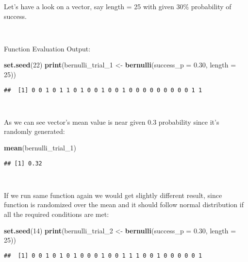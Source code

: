 \documentclass[]{article}
\newenvironment{Shaded}{\begin{snugshade}}{\end{snugshade}}
\newcommand{\DataTypeTok}[1]{\textcolor[rgb]{0.13,0.29,0.53}{#1}}
\newcommand{\DecValTok}[1]{\textcolor[rgb]{0.00,0.00,0.81}{#1}}
\newcommand{\FloatTok}[1]{\textcolor[rgb]{0.00,0.00,0.81}{#1}}
\newcommand{\KeywordTok}[1]{\textcolor[rgb]{0.13,0.29,0.53}{\textbf{#1}}}
\newcommand{\NormalTok}[1]{#1}
\newcommand{\StringTok}[1]{\textcolor[rgb]{0.31,0.60,0.02}{#1}}
\begin{document}
Let's have a look on a vector, say length = 25 with given 30\%
probability of success.

~

Function Evaluation Output:

\begin{Shaded}
\begin{Highlighting}[]
\KeywordTok{set.seed}\NormalTok{(}\DecValTok{22}\NormalTok{)}
\KeywordTok{print}\NormalTok{(bernulli_trial_}\DecValTok{1}\NormalTok{ <-}\StringTok{ }\KeywordTok{bernulli}\NormalTok{(}\DataTypeTok{success_p =} \FloatTok{0.30}\NormalTok{, }\DataTypeTok{length =} \DecValTok{25}\NormalTok{))}
\end{Highlighting}
\end{Shaded}

\begin{verbatim}
##  [1] 0 0 1 0 1 1 0 1 0 0 1 0 0 1 0 0 0 0 0 0 0 0 0 1 1
\end{verbatim}

~

As we can see vector's mean value is near given 0.3 probability since
it's randomly generated:

\begin{Shaded}
\begin{Highlighting}[]
\KeywordTok{mean}\NormalTok{(bernulli_trial_}\DecValTok{1}\NormalTok{)}
\end{Highlighting}
\end{Shaded}

\begin{verbatim}
## [1] 0.32
\end{verbatim}

~

If we run same function again we would get slightly different result,
since function is randomized over the mean and it should follow normal
distribution if all the required conditions are met:

\begin{Shaded}
\begin{Highlighting}[]
\KeywordTok{set.seed}\NormalTok{(}\DecValTok{14}\NormalTok{)}
\KeywordTok{print}\NormalTok{(bernulli_trial_}\DecValTok{2}\NormalTok{ <-}\StringTok{ }\KeywordTok{bernulli}\NormalTok{(}\DataTypeTok{success_p =} \FloatTok{0.30}\NormalTok{, }\DataTypeTok{length =} \DecValTok{25}\NormalTok{))}
\end{Highlighting}
\end{Shaded}

\begin{verbatim}
##  [1] 0 0 1 0 1 0 1 0 0 0 1 0 0 1 1 1 0 0 1 0 0 0 0 0 1
\end{verbatim}
\end{document}
